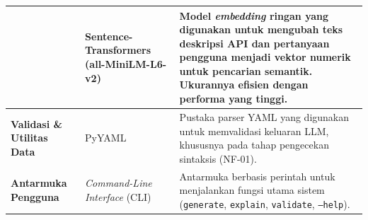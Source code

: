 \begin{longtable}{|p{3cm}|p{4cm}|p{6cm}|}
& Sentence-Transformers (all-MiniLM-L6-v2) &
Model \textit{embedding} ringan yang digunakan untuk mengubah teks deskripsi API dan 
pertanyaan pengguna menjadi vektor numerik untuk pencarian semantik. Ukurannya 
efisien dengan performa yang tinggi. \\ \hline

\textbf{Validasi \& Utilitas Data} &
PyYAML &
Pustaka parser YAML yang digunakan untuk memvalidasi keluaran LLM, khususnya 
pada tahap pengecekan sintaksis (NF-01). \\ \hline

\textbf{Antarmuka Pengguna} &
\textit{Command-Line Interface} (CLI) &
Antarmuka berbasis perintah untuk menjalankan fungsi utama sistem 
(\texttt{generate}, \texttt{explain}, \texttt{validate}, \texttt{--help}). \\ \hline

\end{longtable}
